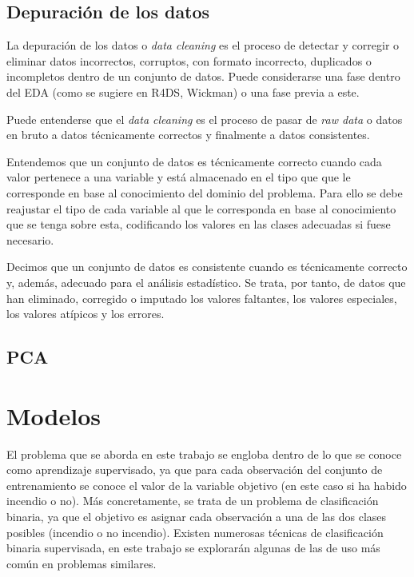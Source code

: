 \documentclass[12pt,a4paper,]{book}
\numberwithin{dummy}{section}
\theoremstyle{ocrenumbox}
\theoremstyle{blacknumex}
\theoremstyle{blacknumbox}
\theoremstyle{ocrenum}
\theoremstyle{ocrenum}
\begin{document}
\hypertarget{depuraciuxf3n-de-los-datos}{%
\subsection{Depuración de los datos}\label{depuraciuxf3n-de-los-datos}}

La depuración de los datos o \emph{data cleaning} es el proceso de
detectar y corregir o eliminar datos incorrectos, corruptos, con formato
incorrecto, duplicados o incompletos dentro de un conjunto de datos.
Puede considerarse una fase dentro del EDA (como se sugiere en R4DS,
Wickman) o una fase previa a este.

Puede entenderse que el \emph{data cleaning} es el proceso de pasar de
\emph{raw data} o datos en bruto a datos técnicamente correctos y
finalmente a datos consistentes.

Entendemos que un conjunto de datos es técnicamente correcto cuando cada
valor pertenece a una variable y está almacenado en el tipo que que le
corresponde en base al conocimiento del dominio del problema. Para ello
se debe reajustar el tipo de cada variable al que le corresponda en base
al conocimiento que se tenga sobre esta, codificando los valores en las
clases adecuadas si fuese necesario.

Decimos que un conjunto de datos es consistente cuando es técnicamente
correcto y, además, adecuado para el análisis estadístico. Se trata, por
tanto, de datos que han eliminado, corregido o imputado los valores
faltantes, los valores especiales, los valores atípicos y los errores.

\hypertarget{pca}{%
\subsection{PCA}\label{pca}}

\hypertarget{modelos}{%
\section{Modelos}\label{modelos}}

El problema que se aborda en este trabajo se engloba dentro de lo que se
conoce como aprendizaje supervisado, ya que para cada observación del
conjunto de entrenamiento se conoce el valor de la variable objetivo (en
este caso si ha habido incendio o no). Más concretamente, se trata de un
problema de clasificación binaria, ya que el objetivo es asignar cada
observación a una de las dos clases posibles (incendio o no incendio).
Existen numerosas técnicas de clasificación binaria supervisada, en este
trabajo se explorarán algunas de las de uso más común en problemas
similares.
\end{document}
